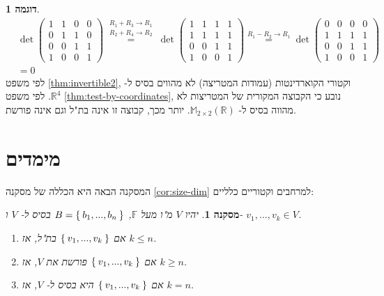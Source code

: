 \documentclass[12pt]{report}
\theoremstyle{plain}
\newtheorem{corollary}[theorem]{מסקנה}
\theoremstyle{definition}
\newtheorem{example}{דוגמה}[chapter]
\newcommand{\R}{\mathbb{R}}
\newcommand{\F}{\mathbb{F}}
\newcommand{\M}{\mathbb{M}}
\newcommand{\0}{\mathbf{0}}
\begin{document}
\begin{example}
$$
\begin{aligned}
&\det\begin{pmatrix}
1 & 1 & 0 & 0 \\
0 & 1 & 1 & 0 \\
0 & 0 & 1 & 1 \\
1 & 0 & 0 & 1
\end{pmatrix}\overset{\substack{R_1+R_3\to R_1\\ R_2+R_4\to R_2}}{=}\det\begin{pmatrix}
1 & 1 & 1 & 1 \\
1 & 1 & 1 & 1 \\
0 & 0 & 1 & 1 \\
1 & 0 & 0 & 1
\end{pmatrix}\overset{R_1-R_2\to R_1}{=}\det\begin{pmatrix}
0 & 0 & 0 & 0 \\
1 & 1 & 1 & 1 \\
0 & 0 & 1 & 1 \\
1 & 0 & 0 & 1
\end{pmatrix}\\
&=0
\end{aligned}
$$
לפי משפט
\ref{thm:invertible2},
וקטורי הקוארדינטות (עמודות המטריצה) לא מהווים בסיס ל-
$\R^4$.
לפי משפט
\ref{thm:test-by-coordinates},
נובע כי הקבוצה המקורית של המטריצות לא מהווה בסיס ל-
$\M_{2\times 2}(\R)$.
יותר מכך, קבוצה זו אינה בת"ל וגם אינה פורשת.
\end{example}

\section{מימדים}

המסקנה הבאה היא הכללה של מסקנה
\ref{cor:size-dim}
למרחבים וקטוריים כלליים:

\begin{corollary}\label{cor:size-dim2}
יהיו
$V$
מ"ו מעל
$\F$,
$B=\Set{b_1,...,b_n}$
בסיס ל-
$V$
ו-
$v_1,...,v_k\in V$.
\begin{enumerate}[label=\alph*.]
\item 
אם 
$\Set{v_1,...,v_k}$
בת"ל, אז
$k\leq n$.


\item 
אם
$\Set{v_1,...,v_k}$
פורשת את
$V$,
אז
$k\geq n$.


\item
אם
$\Set{v_1,...,v_k}$
היא בסיס ל-
$V$,
אז
$k=n$.


\end{enumerate}
\end{corollary}
\end{document}
